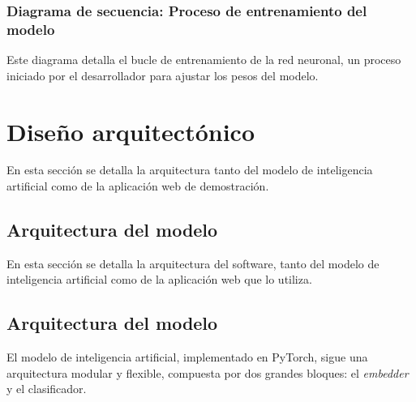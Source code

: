
\subsubsection{Diagrama de secuencia: Proceso de entrenamiento del modelo}
Este diagrama detalla el bucle de entrenamiento de la red neuronal, un proceso iniciado por el desarrollador para ajustar los pesos del modelo.

%	


\section{Diseño arquitectónico}
En esta sección se detalla la arquitectura tanto del modelo de inteligencia artificial como de la aplicación web de demostración.

\subsection{Arquitectura del modelo}
En esta sección se detalla la arquitectura del software, tanto del modelo de inteligencia artificial como de la aplicación web que lo utiliza.

\subsection*{Arquitectura del modelo}
El modelo de inteligencia artificial, implementado en PyTorch, sigue una arquitectura modular y flexible, compuesta por dos grandes bloques: el \textit{embedder} y el clasificador.

